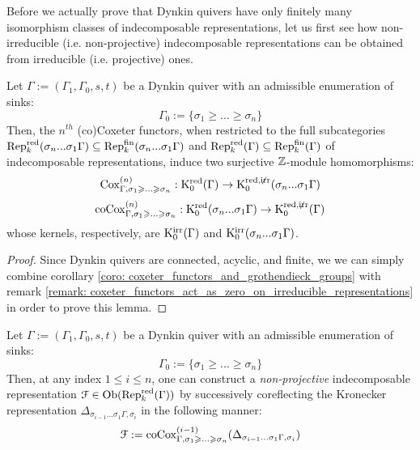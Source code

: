             Before we actually prove that Dynkin quivers have only finitely many isomorphism classes of indecomposable representations, let us first see how non-irreducible (i.e. non-projective) indecomposable representations can be obtained from irreducible (i.e. projective) ones.
            \begin{lemma} \label{lemma: coxeter_functors_are_essentially_surjective_on_indecomposable_representations}
                Let $\Gamma := (\Gamma_1, \Gamma_0, s, t)$ be a Dynkin quiver with an admissible enumeration of sinks:
                    $$\Gamma_0 := \{\sigma_1 \geq ... \geq \sigma_n\}$$
                Then, the $n^{th}$ (co)Coxeter functors, when restricted to the full subcategories $\mathrm{Rep}_k^{\mathrm{red}}(\sigma_n ... \sigma_1\Gamma) \subseteq \mathrm{Rep}_k^{\mathrm{fin}}(\sigma_n ... \sigma_1\Gamma)$ and $\mathrm{Rep}_k^{\mathrm{red}}(\Gamma) \subseteq \mathrm{Rep}_k^{\mathrm{fin}}(\Gamma)$ of indecomposable representations, induce two surjective $\mathbb{Z}$-module homomorphisms:
                    $$\mathrm{Cox}_{\Gamma, \sigma_1 \geqslant ...\geqslant \sigma_n}^{(n)}: \mathrm{K}_0^{\mathrm{red}}(\Gamma) \to \mathrm{K}_0^{\mathrm{red}, \not \mathrm{irr}}(\sigma_n ... \sigma_1\Gamma)$$  
                    $$\mathrm{co}\mathrm{Cox}_{\Gamma, \sigma_1 \geqslant ...\geqslant \sigma_n}^{(n)}: \mathrm{K}_0^{\mathrm{red}}(\sigma_n ... \sigma_1\Gamma) \to \mathrm{K}_0^{\mathrm{red}, \not \mathrm{irr}}(\Gamma)$$
                whose kernels, respectively, are $\mathrm{K}_0^{\mathrm{irr}}(\Gamma)$ and $\mathrm{K}_0^{\mathrm{irr}}(\sigma_n ... \sigma_1 \Gamma)$.
            \end{lemma}
                \begin{proof}
                    Since Dynkin quivers are connected, acyclic, and finite, we we can simply combine corollary \ref{coro: coxeter_functors_and_grothendieck_groups} with remark \ref{remark: coxeter_functors_act_as_zero_on_irreducible_representations} in order to prove this lemma. 
                \end{proof}
            \begin{lemma} \label{lemma: indecomposable_representations_from_irreducible_representations_through_corelfections}
                Let $\Gamma := (\Gamma_1, \Gamma_0, s, t)$ be a Dynkin quiver with an admissible enumeration of sinks:
                    $$\Gamma_0 := \{\sigma_1 \geq ... \geq \sigma_n\}$$
                Then, at any index $1 \leq i \leq n$, one can construct a \textit{non-projective} indecomposable representation $\mathcal{F} \in \mathrm{Ob}(\mathrm{Rep}_k^{\mathrm{red}}(\Gamma))$ by successively coreflecting the Kronecker representation $\Delta_{\sigma_{i - 1} ... \sigma_1 \Gamma, \sigma_i}$ in the following manner:
                    $$\mathcal{F} := \mathrm{co}\mathrm{Cox}^{(i - 1)}_{\Gamma, \sigma_1 \geqslant ... \geqslant \sigma_n}(\Delta_{\sigma_{i - 1} ... \sigma_1 \Gamma, \sigma_i})$$
            \end{lemma}

